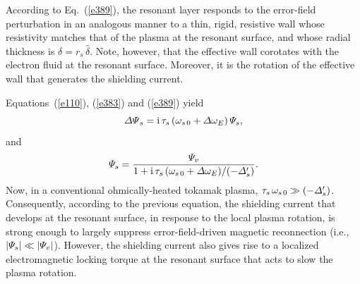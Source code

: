 \documentclass[12pt,prb,aps]{revtex4-1}
\begin{document}
According to Eq.~(\ref{e389}), the resonant layer responds to the error-field
perturbation in an analogous manner to a thin, rigid, resistive wall whose resistivity matches that of the plasma at the
resonant surface, and whose radial thickness is $\delta=r_s\,\hat{\delta}$. Note, however, that the effective wall corotates with the
electron fluid at the resonant surface. Moreover, it is the rotation of the effective wall that generates the shielding current. 

Equations~(\ref{e110}), (\ref{e383}) and (\ref{e389}) yield
\begin{equation}\label{e391}
{\mit\Delta\Psi}_s ={\rm i}\,\tau_s\,(\omega_{s\,0}+{\mit\Delta}\omega_E)\,{\mit\Psi}_s,
\end{equation}
and 
\begin{equation}\label{e392}
{\mit\Psi}_s=\frac{{\mit\Psi}_v}{1+ {\rm i}\,\tau_s\,(\omega_{s\,0}+ {\mit\Delta}\omega_E)/(-{\mit\Delta}_s')}.
\end{equation}
Now, in a conventional ohmically-heated tokamak plasma, $\tau_s\,\omega_{s\,0}\gg (-{\mit\Delta}_s')$. Consequently, according to the previous equation, the
shielding current that develops at the resonant surface, in response to the local plasma rotation, is strong enough to largely
suppress error-field-driven magnetic reconnection (i.e., $|{\mit\Psi}_s|\ll |{\mit\Psi}_v|$). However, the shielding current also gives rise to a localized electromagnetic
locking torque at the resonant surface  that acts to slow the plasma rotation. 
\end{document}
